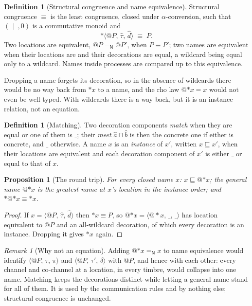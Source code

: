 \documentclass[11pt,a4paper]{article}
\makeatletter
\theoremstyle{plain}
\newtheorem{proposition}[theorem]{Proposition}
\theoremstyle{definition}
\newtheorem{definition}[theorem]{Definition}
\theoremstyle{remark}
\newtheorem{remark}[theorem]{Remark}
\newcommand{\rhoc}{\textsf{rho}}
\newcommand{\scong}{\equiv}
\newcommand{\nameq}{=_{\mathsf{N}}}
\newcommand{\nm}[3]{\langle @#1,\,#2,\,#3\rangle}
\newcommand{\drop}{{*}}
\newcommand{\wild}{\_}
\newcommand{\gen}{\sqsubseteq}
\newcommand{\meet}{\sqcap}
\makeatother
\begin{document}
\begin{definition}[Structural congruence and name equivalence]\label{def:cong}
Structural congruence $\scong$ is the least congruence, closed under
$\alpha$-conversion, such that $(\,\mid\,, 0)$ is a commutative monoid and
\[
\drop\nm{P}{\hat\tau}{\hat d} \;\scong\; P .
\]
Two locations are equivalent, $@P \nameq @P'$, when $P \scong P'$; two names are
equivalent when their locations are and their decorations are equal, a wildcard
being equal only to a wildcard. Names inside processes are compared up to this
equivalence.
\end{definition}

Dropping a name forgets its decoration, so in the absence of wildcards there
would be no way back from $\drop x$ to a name, and the \rhoc{} law $@{\drop x} =
x$ would not even be well typed. With wildcards there is a way back, but it is
an instance relation, not an equation.

\begin{definition}[Matching]\label{def:match}
Two decoration components \emph{match} when they are equal or one of them is
$\wild$; their \emph{meet} $\hat a \meet \hat b$ is then the concrete one if
either is concrete, and $\wild$ otherwise. A name $x$ is an \emph{instance} of
$x'$, written $x \gen x'$, when their locations are equivalent and each
decoration component of $x'$ is either $\wild$ or equal to that of $x$.
\end{definition}

\begin{proposition}[The round trip]\label{prop:roundtrip}
For every closed name $x$: $x \gen @{\drop x}$; the general name $@{\drop x}$ is
the greatest name at $x$'s location in the instance order; and
$\drop @{\drop x} \scong \drop x$.
\end{proposition}
\begin{proof}
If $x = \nm{P}{\hat\tau}{\hat d}$ then $\drop x \scong P$, so
$@{\drop x} = \nm{\drop x}{\wild}{\wild}$ has location equivalent to $@P$ and an
all-wildcard decoration, of which every decoration is an instance. Dropping it
gives $\drop x$ again.
\end{proof}

\begin{remark}[Why not an equation]\label{rem:notequation}
Adding $@{\drop x} \nameq x$ to name equivalence would identify
$\nm{P}{\tau}{\pi}$ and $\nm{P}{\tau'}{\delta}$ with $@P$, and hence with each
other: every channel and co-channel at a location, in every timbre, would
collapse into one name. Matching keeps the decorations distinct while letting a
general name stand for all of them. It is used by the communication rules and by
nothing else; structural congruence is unchanged.
\end{remark}
\end{document}
